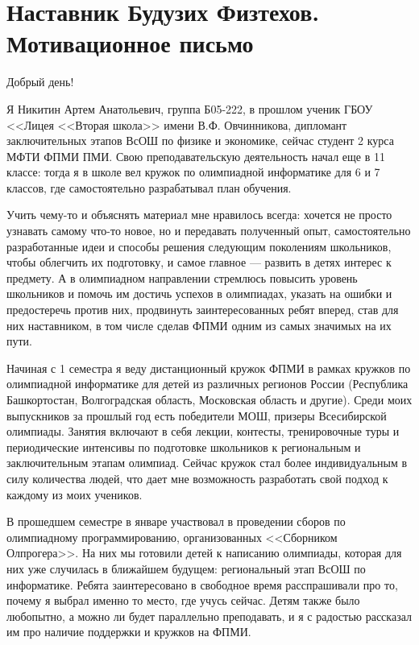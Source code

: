 \section{\textbf{Наставник Будузих Физтехов. Мотивационное письмо}}
\smallskip

\quad Добрый день!
\smallskip

\quad Я Никитин Артем Анатольевич, группа Б05-222, в прошлом ученик ГБОУ <<Лицея <<Вторая школа>> имени В.Ф. Овчинникова, дипломант
заключительных этапов ВсОШ по физике и экономике, сейчас студент 2 курса МФТИ ФПМИ ПМИ. Свою преподавательскую деятельность начал еще в
11 классе: тогда я в школе вел кружок по олимпиадной информатике для 6 и 7 классов, где самостоятельно разрабатывал план обучения.

\quad Учить чему-то и объяснять материал мне нравилось всегда: хочется не просто узнавать самому что-то новое, но и передавать полученный
опыт, самостоятельно разработанные идеи и способы решения следующим поколениям школьников, чтобы облегчить их подготовку, и самое главное –--
развить в детях интерес к предмету. А в олимпиадном направлении стремлюсь повысить уровень школьников и помочь им достичь успехов в олимпиадах,
указать на ошибки и предостеречь против них, продвинуть заинтересованных ребят вперед, став для них наставником, в том числе сделав ФПМИ одним
из самых значимых на их пути.

\quad Начиная с 1 семестра я веду дистанционный кружок ФПМИ в рамках кружков по олимпиадной информатике для детей из различных регионов России
(Республика Башкортостан, Волгоградская область, Московская область и другие). Среди моих выпускников за прошлый год есть победители МОШ,
призеры Всесибирской олимпиады. Занятия включают в себя лекции, контесты, тренировочные туры и периодические интенсивы по подготовке школьников
к региональным и заключительным этапам олимпиад. Сейчас кружок стал более индивидуальным в силу количества людей, что дает мне возможность
разработать свой подход к каждому из моих учеников.

\quad В прошедшем семестре в январе участвовал в проведении сборов по олимпиадному программированию, организованных <<Сборником Олпрогера>>. На
них мы готовили детей к написанию олимпиады, которая для них уже случилась в ближайшем будущем: региональный этап ВсОШ по информатике. Ребята
заинтересовано в свободное время расспрашивали про то, почему я выбрал именно то место, где учусь сейчас. Детям также было любопытно, а можно
ли будет параллельно преподавать, и я с радостью рассказал им про наличие поддержки и кружков на ФПМИ.


